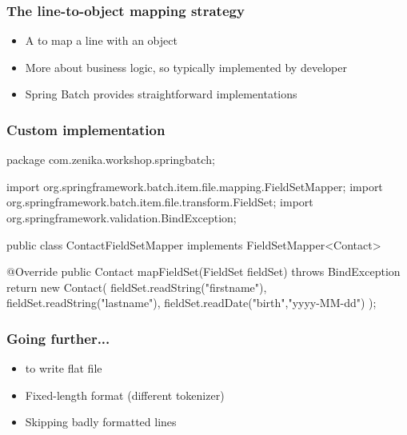 \begin{frame}
 \frametitle{The line-to-object mapping strategy}
 \begin{itemize}
  \item A  to map a line with an object
  \item More about business logic, so typically implemented by developer
  \item Spring Batch provides straightforward implementations
 \end{itemize}
\end{frame}

\begin{frame}[fragile]
 \frametitle{Custom  implementation}

\begin{javacode}
package com.zenika.workshop.springbatch;

import org.springframework.batch.item.file.mapping.FieldSetMapper;
import org.springframework.batch.item.file.transform.FieldSet;
import org.springframework.validation.BindException;

public class ContactFieldSetMapper implements FieldSetMapper<Contact> {

  @Override
  public Contact mapFieldSet(FieldSet fieldSet) throws BindException {
    return new Contact(
      fieldSet.readString("firstname"),
      fieldSet.readString("lastname"), 
      fieldSet.readDate("birth","yyyy-MM-dd")
    );
  }
}
\end{javacode}

\end{frame}


\begin{frame}
 \frametitle{Going further...}
 \begin{itemize}
  \item {} to write flat file
  \item Fixed-length format (different tokenizer)
  \item Skipping badly formatted lines
 \end{itemize}
\end{frame}
